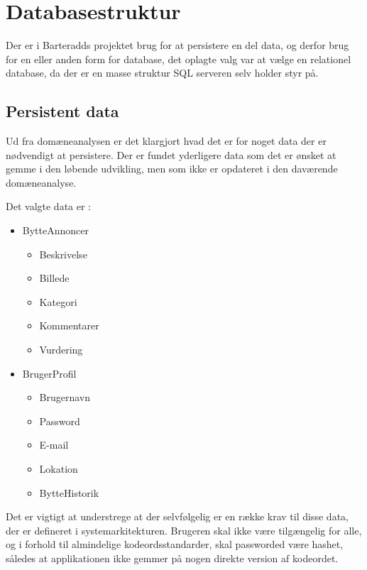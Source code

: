 \chapter{Databasestruktur}
Der er i Barteradds projektet brug for at persistere en del data, og derfor brug for en eller anden form for database, det oplagte valg var at vælge en relationel database, da der er en masse struktur SQL serveren selv holder styr på.

\section{Persistent data}
Ud fra domæneanalysen er det klargjort hvad det er for noget data der er nødvendigt at persistere. Der er fundet yderligere data som det er ønsket at gemme i den løbende udvikling, men som ikke er opdateret i den daværende domæneanalyse.

Det valgte data er :
\begin{itemize}
	\item BytteAnnoncer
	\begin{itemize}
		\item Beskrivelse 
		\item Billede 
		\item Kategori
		\item Kommentarer
		\item Vurdering
	\end{itemize}
	\item BrugerProfil
	\begin{itemize}
		\item Brugernavn
		\item Password
		\item E-mail
		\item Lokation
		\item BytteHistorik
	\end{itemize}
\end{itemize} 

Det er vigtigt at understrege at der selvfølgelig er en række krav til disse data, der er defineret i systemarkitekturen. Brugeren skal ikke være tilgængelig for alle, og i forhold til almindelige kodeordsstandarder, skal passworded være hashet, således at applikationen ikke gemmer på nogen direkte version af kodeordet. 


